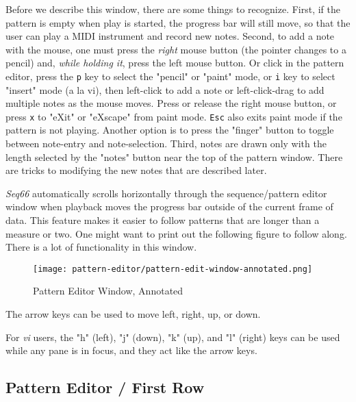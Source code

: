    Before we describe this window, there are some things to recognize.
   First, if the pattern is empty when play is started, the progress bar will
   still move, so that the user can play a MIDI instrument and record new notes.
   Second, to add a note with the mouse, one must press the \textsl{right}
   mouse button (the pointer changes to a pencil) and,
   \textsl{while holding it}, press the left mouse button.
   Or click in the pattern editor, press the
   \texttt{p} key to select the "pencil" or "paint" mode,
   or
   \texttt{i} key to select "insert" mode (a la vi),
   then
   left-click to add a note or
   left-click-drag to add multiple notes as the mouse moves.
   Press or release the right mouse button, or press
   \texttt{x} to "eXit" or "eXscape" from paint mode.
   \texttt{Esc} also exits paint mode if the pattern is not playing.
   Another option is to press the "finger" button to toggle between note-entry
   and note-selection.
   Third, notes are drawn only with the length selected by the "notes" button
   near the top of the pattern window.  There are tricks to
   modifying the new notes that are described later.

   \textsl{Seq66} automatically scrolls
   horizontally through the sequence/pattern editor window when
   playback moves the progress bar outside of the current frame of data.  This
   feature makes it easier to follow patterns that are longer than a measure or
   two.
   One might want to print out the following figure to follow along.  There is
   a lot of functionality in this window.

\begin{figure}[H]
   \centering 
   \texttt{[image: pattern-editor/pattern-edit-window-annotated.png]}
   \caption{Pattern Editor Window, Annotated}
   \label{fig:pattern_editor_window_annotated}
\end{figure}

   The arrow keys can be used to move left, right, up, or down.

   For \textsl{vi} users, the "h" (left), "j" (down), "k" (up), and "l" (right)
   keys can be used while any pane is in focus, and they act like the arrow
   keys.

\subsection{Pattern Editor / First Row}
\label{subsec:pattern_editor_first_row}

